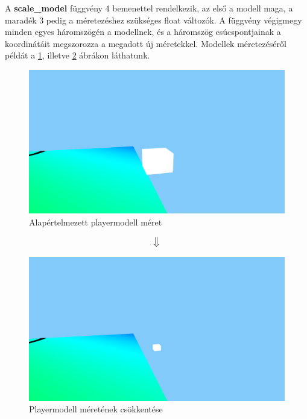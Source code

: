 A \textbf{scale\_model} függvény 4 bemenettel rendelkezik, az első a modell maga, a maradék 3 pedig a méretezéshez szükséges float változók. A függvény végigmegy minden egyes háromszögén a modellnek, és a háromszög csúcspontjainak a koordinátáit megszorozza a megadott új méretekkel. Modellek méretezéséről példát a \ref{fig:meret_1}, illetve \ref{fig:meret_2} ábrákon láthatunk.
\newpage

\begin{figure}[h]
	\centering
	\includegraphics[width=13truecm, height=7truecm]{images/modell_4.3.1.1.png}
	\caption{Alapértelmezett playermodell méret}
	\label{fig:meret_1}
\end{figure}

	$$\big\Downarrow$$
	
	
\begin{figure}[h]
		\centering
		\includegraphics[width=13truecm, height=7truecm]{images/modell_4.3.1.3.png}
		\caption{Playermodell méretének csökkentése}
		\label{fig:meret_2}
\end{figure}

	



